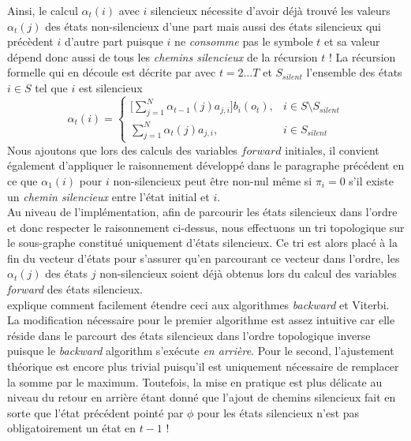 \documentclass[letterpaper]{article}
\begin{document}
Ainsi, le calcul $\alpha_t(i)$ avec $i$ silencieux nécessite d'avoir déjà trouvé les valeurs $\alpha_t(j)$ des états non-silencieux d'une part mais aussi des états silencieux qui précèdent $i$ d'autre part puisque $i$ ne \textit{consomme} pas le symbole $t$ et sa valeur dépend donc aussi de tous les \textit{chemins silencieux} de la récursion $t$ ! La récursion formelle qui en découle est décrite par \cite{Durbin} avec $t=2\dots T$ et $S_{silent}$ l'ensemble des états $i \in S$ tel que $i$ est silencieux 
\begin{equation}
\alpha_t(i) = 
\begin{cases}
	\Big[ \sum_{j=1}^{N}\alpha_{t-1}(j)a_{j,i} \Big] b_i(o_t), & i \in S \setminus S_{silent} \\
	\sum_{j=1}^{N}\alpha_{t}(j)a_{j,i}, & i \in S_{silent}
\end{cases}
\end{equation}
Nous ajoutons que lors des calculs des variables $forward$ initiales, il convient également d'appliquer le raisonnement développé dans le paragraphe précédent en ce que $\alpha_1(i)$ pour $i$ non-silencieux peut être non-nul même si $\pi_i = 0$ s'il existe un \textit{chemin silencieux} entre l'état initial et $i$. \\

Au niveau de l'implémentation, afin de parcourir les états silencieux dans l'ordre et donc respecter le raisonnement ci-dessus, nous effectuons un tri topologique sur le sous-graphe constitué uniquement d'états silencieux. Ce tri est alors placé à la fin du vecteur d'états pour s'assurer qu'en parcourant ce vecteur dans l'ordre, les $\alpha_t(j)$ des états $j$ non-silencieux soient déjà obtenus lors du calcul des variables \textit{forward} des états silencieux. \\

\cite{Durbin} explique comment facilement étendre ceci aux algorithmes \textit{backward} et Viterbi. La modification nécessaire pour le premier algorithme est assez intuitive car elle réside dans le parcourt des états silencieux dans l'ordre topologique inverse puisque le \textit{backward} algorithm s'exécute \textit{en arrière}. Pour le second, l'ajustement théorique est encore plus trivial puisqu'il est uniquement nécessaire de remplacer la somme par le maximum. Toutefois, la mise en pratique est plus délicate au niveau du retour en arrière étant donné que l'ajout de chemins silencieux fait en sorte que l'état précédent pointé par $\phi$ pour les états silencieux n'est pas obligatoirement un état en $t-1$ !
\end{document}
